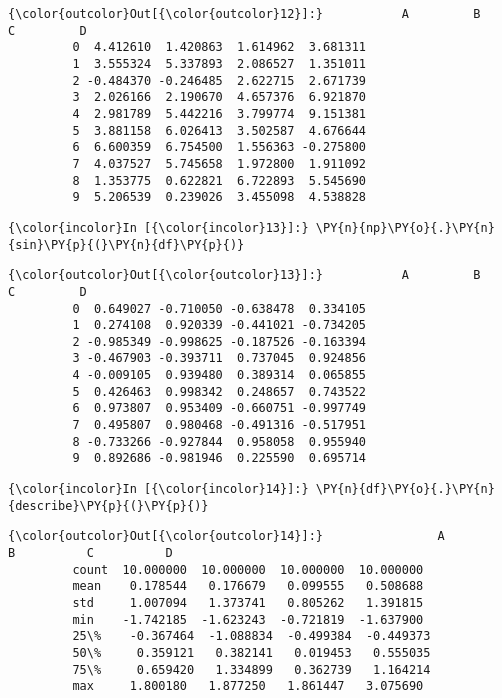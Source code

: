             \begin{Verbatim}[commandchars=\\\{\}]
{\color{outcolor}Out[{\color{outcolor}12}]:}           A         B         C         D
         0  4.412610  1.420863  1.614962  3.681311
         1  3.555324  5.337893  2.086527  1.351011
         2 -0.484370 -0.246485  2.622715  2.671739
         3  2.026166  2.190670  4.657376  6.921870
         4  2.981789  5.442216  3.799774  9.151381
         5  3.881158  6.026413  3.502587  4.676644
         6  6.600359  6.754500  1.556363 -0.275800
         7  4.037527  5.745658  1.972800  1.911092
         8  1.353775  0.622821  6.722893  5.545690
         9  5.206539  0.239026  3.455098  4.538828
\end{Verbatim}
        
    \begin{Verbatim}[commandchars=\\\{\}]
{\color{incolor}In [{\color{incolor}13}]:} \PY{n}{np}\PY{o}{.}\PY{n}{sin}\PY{p}{(}\PY{n}{df}\PY{p}{)}
\end{Verbatim}

            \begin{Verbatim}[commandchars=\\\{\}]
{\color{outcolor}Out[{\color{outcolor}13}]:}           A         B         C         D
         0  0.649027 -0.710050 -0.638478  0.334105
         1  0.274108  0.920339 -0.441021 -0.734205
         2 -0.985349 -0.998625 -0.187526 -0.163394
         3 -0.467903 -0.393711  0.737045  0.924856
         4 -0.009105  0.939480  0.389314  0.065855
         5  0.426463  0.998342  0.248657  0.743522
         6  0.973807  0.953409 -0.660751 -0.997749
         7  0.495807  0.980468 -0.491316 -0.517951
         8 -0.733266 -0.927844  0.958058  0.955940
         9  0.892686 -0.981946  0.225590  0.695714
\end{Verbatim}
        
    \begin{Verbatim}[commandchars=\\\{\}]
{\color{incolor}In [{\color{incolor}14}]:} \PY{n}{df}\PY{o}{.}\PY{n}{describe}\PY{p}{(}\PY{p}{)}
\end{Verbatim}

            \begin{Verbatim}[commandchars=\\\{\}]
{\color{outcolor}Out[{\color{outcolor}14}]:}                A          B          C          D
         count  10.000000  10.000000  10.000000  10.000000
         mean    0.178544   0.176679   0.099555   0.508688
         std     1.007094   1.373741   0.805262   1.391815
         min    -1.742185  -1.623243  -0.721819  -1.637900
         25\%    -0.367464  -1.088834  -0.499384  -0.449373
         50\%     0.359121   0.382141   0.019453   0.555035
         75\%     0.659420   1.334899   0.362739   1.164214
         max     1.800180   1.877250   1.861447   3.075690
\end{Verbatim}
        
